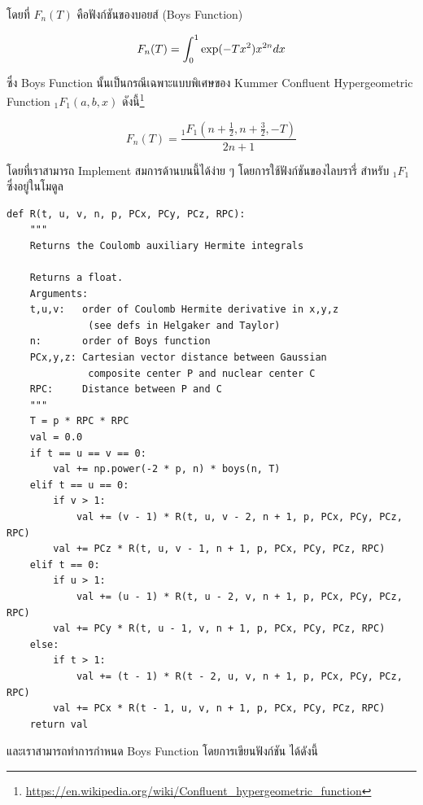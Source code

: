 \noindent โดยที่ $F_n(T)$ คือฟังก์ชันของบอยส์ (Boys Function)

\begin{equation}
  F_n(T)
  =
  \int_0^1 \hbox{exp}(-Tx^2)x^{2n}dx
\end{equation}

\noindent ซึ่ง Boys Function นั้นเป็นกรณีเฉพาะแบบพิเศษของ Kummer Confluent Hypergeometric Function $_1F_1(a,b,x)$
ดังนี้\footnote{\url{https://en.wikipedia.org/wiki/Confluent_hypergeometric_function}}

\begin{equation}
  F_n(T)
  =
  \frac{_1F_1(n+\frac{1}{2}, n+\frac{3}{2}, -T)}{2n+1}
\end{equation}

\noindent โดยที่เราสามารถ Implement สมการด้านบนนี้ได้ง่าย ๆ โดยการใช้ฟังก์ชันของไลบรารี่  สำหรับ $_1F_1$
ซึ่งอยู่ในโมดูล 

\vspace{5pt}

\begin{lstlisting}[style=MyPython]
def R(t, u, v, n, p, PCx, PCy, PCz, RPC):
    """
    Returns the Coulomb auxiliary Hermite integrals

    Returns a float.
    Arguments:
    t,u,v:   order of Coulomb Hermite derivative in x,y,z
              (see defs in Helgaker and Taylor)
    n:       order of Boys function
    PCx,y,z: Cartesian vector distance between Gaussian
              composite center P and nuclear center C
    RPC:     Distance between P and C
    """
    T = p * RPC * RPC
    val = 0.0
    if t == u == v == 0:
        val += np.power(-2 * p, n) * boys(n, T)
    elif t == u == 0:
        if v > 1:
            val += (v - 1) * R(t, u, v - 2, n + 1, p, PCx, PCy, PCz, RPC)
        val += PCz * R(t, u, v - 1, n + 1, p, PCx, PCy, PCz, RPC)
    elif t == 0:
        if u > 1:
            val += (u - 1) * R(t, u - 2, v, n + 1, p, PCx, PCy, PCz, RPC)
        val += PCy * R(t, u - 1, v, n + 1, p, PCx, PCy, PCz, RPC)
    else:
        if t > 1:
            val += (t - 1) * R(t - 2, u, v, n + 1, p, PCx, PCy, PCz, RPC)
        val += PCx * R(t - 1, u, v, n + 1, p, PCx, PCy, PCz, RPC)
    return val
\end{lstlisting}

\vspace{5pt}

\noindent และเราสามารถทำการกำหนด Boys Function โดยการเขียนฟังก์ชัน  ได้ดังนี้

\vspace{5pt}


